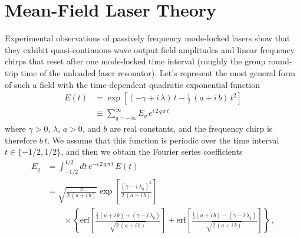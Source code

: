 %
%
%
\section{Mean-Field Laser Theory\label{sct:laser_dynamics_1d_mml_mfl}}

Experimental observations of passively frequency mode-locked lasers show that they exhibit quasi-continuous-wave output field amplitudes and linear frequency chirps that reset after one mode-locked time interval (roughly the group round-trip time of the unloaded laser resonator). Let's represent the most general form of such a field with the time-dependent quadratic exponential function
\begin{equation} \label{eqn:mlft_field_quad}
    \begin{split}
        E(t) &= \exp\left[(-\gamma + i\, \lambda)\, t - \frac{1}{2}\, (a + i\, b)\, t^2\right] \\
        &\equiv \sum_{q = -\infty}^{\infty} E_q\, e^{i\, 2\, q\, \pi\, t}
    \end{split}
\end{equation}
where $\gamma > 0$, $\lambda$, $a > 0$, and $b$ are real constants, and the frequency chirp is therefore $b\, t$. We assume that this function is periodic over the time interval $t \in \{-1/2, 1/2\}$, and then we obtain the Fourier series coefficients
\begin{equation} \label{eqn:mflt_fourier_coeff}
    \begin{split}
        E_q &= \int^{1/2}_{-1/2} d t\, e^{-i\, 2\, q\, \pi\, t}\, E(t) \\
        &= \sqrt{\frac{\pi}{2\, (a + i\, b)}} \exp\left[ \frac{(\gamma - i\, \lambda_q)^2}{2\, (a + i\, b)} \right] \\
        &\qquad \times \left\{ \mathrm{erf}\left[ \frac{\frac{1}{2}(a + i\, b) + (\gamma - i\, \lambda_q)}{\sqrt{2\, (a + i\, b)}} \right] + \mathrm{erf}\left[ \frac{\frac{1}{2}(a + i\, b) - (\gamma - i\, \lambda_q)}{\sqrt{2\, (a + i\, b)}} \right] \right\}\, ,
    \end{split}
\end{equation}
